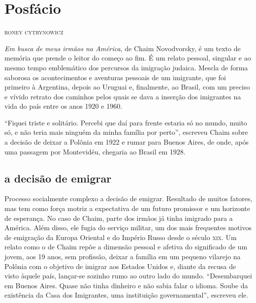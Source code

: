 \chapter*{Posfácio\smallskip{}}

\begin{flushright}
\textsc{roney cytrynowicz}
\end{flushright}\medskip

\noindent{}\textit{Em busca de meus irmãos na América}, de Chaim
Novodvorsky, é um texto de memória que prende o leitor do começo ao fim.
É um relato pessoal, singular e ao mesmo tempo emblemático dos
percursos da imigração judaica. Mescla de forma saborosa os
acontecimentos e aventuras pessoais de um imigrante, que foi primeiro
à Argentina, depois ao Uruguai e, finalmente, ao Brasil, com um preciso
e vívido retrato dos caminhos pelos quais se dava a inserção dos
imigrantes na vida do país entre os anos 1920 e 1960.

``Fiquei triste e solitário. Percebi que daí para frente estaria
só no mundo, muito só, e não teria mais ninguém da minha família por perto'', escreveu Chaim sobre a decisão de deixar a
Polônia em 1922 e rumar para Buenos Aires, de onde, após uma passagem
por Montevidéu, chegaria ao Brasil em 1928. 

\section{a decisão de emigrar}

Processo socialmente complexo a decisão de emigrar. Resultado de muitos fatores, mas tem 
como força motriz a expectativa de um futuro promissor e um horizonte de
esperança. No caso de Chaim, parte dos irmãos já tinha imigrado para a
América. Além disso, ele fugia do serviço militar, um dos mais frequentes
motivos de emigração da Europa Oriental e do Império Russo desde o
século \textsc{xix}. Um relato como o de Chaim repõe a dimensão pessoal e afetiva do
significado de um jovem, aos 19 anos, sem profissão, deixar a família em
um pequeno vilarejo na Polônia com o objetivo de imigrar aos Estados
Unidos e, diante da recusa de visto àquele país, lançar-se sozinho rumo
ao outro lado do mundo. ``Desembarquei em Buenos Aires. Quase não tinha dinheiro e não sabia falar
o idioma. Soube da existência da Casa dos Imigrantes, uma instituição governamental'', escreveu ele.

